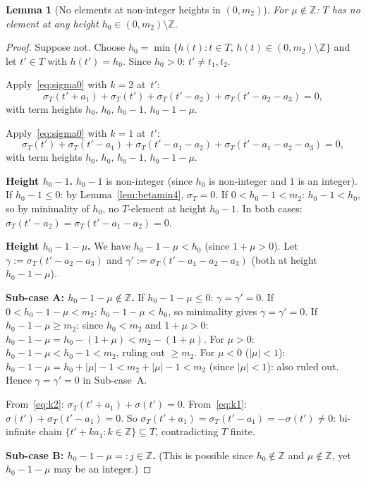 \documentclass{article}
\newtheorem{lemma}{Lemma}
\begin{document}
\begin{lemma}[No elements at non-integer heights in $(0,m_2)$]\label{lem:nogaps}
For $\mu\notin\mathbb{Z}$\textup{:}
$T$ has no element at any height $h_0\in(0,m_2)\setminus\mathbb{Z}$.
\end{lemma}
\begin{proof}
Suppose not.  Choose $h_0=\min\{h(t):t\in T,\,h(t)\in(0,m_2)\setminus\mathbb{Z}\}$
and let $t'\in T$ with $h(t')=h_0$.  Since $h_0>0$: $t'\ne t_1,t_2$.

Apply~\eqref{eq:sigma0} with $k=2$ at~$t'$:
\begin{equation}\label{eq:k2}
  \sigma_T(t'+a_1)+\sigma_T(t')+\sigma_T(t'-a_2)+\sigma_T(t'-a_2-a_3)=0,
\end{equation}
with term heights $h_0,\,h_0,\,h_0-1,\,h_0-1-\mu$.

Apply~\eqref{eq:sigma0} with $k=1$ at~$t'$:
\begin{equation}\label{eq:k1}
  \sigma_T(t')+\sigma_T(t'-a_1)+\sigma_T(t'-a_1-a_2)+\sigma_T(t'-a_1-a_2-a_3)=0,
\end{equation}
with term heights $h_0,\,h_0,\,h_0-1,\,h_0-1-\mu$.

\textbf{Height $h_0-1$.}
$h_0-1$ is non-integer (since $h_0$ is non-integer and $1$ is an integer).
If $h_0-1\le 0$: by Lemma~\ref{lem:betamin4}, $\sigma_T=0$.
If $0<h_0-1<m_2$: $h_0-1<h_0$, so by minimality of $h_0$, no $T$-element at height $h_0-1$.
In both cases: $\sigma_T(t'-a_2)=\sigma_T(t'-a_1-a_2)=0$.

\textbf{Height $h_0-1-\mu$.}
We have $h_0-1-\mu<h_0$ (since $1+\mu>0$).
Let $\gamma:=\sigma_T(t'-a_2-a_3)$ and $\gamma':=\sigma_T(t'-a_1-a_2-a_3)$
(both at height $h_0-1-\mu$).

\textbf{Sub-case A: $h_0-1-\mu\notin\mathbb{Z}$.}
If $h_0-1-\mu\le 0$: $\gamma=\gamma'=0$.
If $0<h_0-1-\mu<m_2$: $h_0-1-\mu<h_0$, so minimality gives $\gamma=\gamma'=0$.
If $h_0-1-\mu\ge m_2$: since $h_0<m_2$ and $1+\mu>0$: $h_0-1-\mu=h_0-(1+\mu)<m_2-(1+\mu)$.
For $\mu>0$: $h_0-1-\mu<h_0-1<m_2$, ruling out $\ge m_2$.
For $\mu<0$ ($|\mu|<1$): $h_0-1-\mu=h_0+|\mu|-1<m_2+|\mu|-1<m_2$ (since $|\mu|<1$): also ruled out.
Hence $\gamma=\gamma'=0$ in Sub-case~A.

From~\eqref{eq:k2}: $\sigma_T(t'+a_1)+\sigma(t')=0$.
From~\eqref{eq:k1}: $\sigma(t')+\sigma_T(t'-a_1)=0$.
So $\sigma_T(t'+a_1)=\sigma_T(t'-a_1)=-\sigma(t')\ne 0$:
bi-infinite chain $\{t'+ka_1:k\in\mathbb{Z}\}\subseteq T$, contradicting $T$ finite.

\textbf{Sub-case B: $h_0-1-\mu=:j\in\mathbb{Z}$.}
(This is possible since $h_0\notin\mathbb{Z}$ and $\mu\notin\mathbb{Z}$, yet $h_0-1-\mu$ may be an integer.)


\end{proof}
\end{document}
